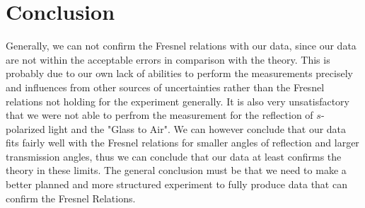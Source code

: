 \section{Conclusion}
Generally, we can not confirm the Fresnel relations with our data, since our data are not within the acceptable errors in comparison with the theory. This is probably due to our own lack of abilities to perform the measurements precisely and influences from other sources of uncertainties rather than the Fresnel relations not holding for the experiment generally. It is also very unsatisfactory that we were not able to perfrom the measurement for the reflection of $s$-polarized light and the "Glass to Air". We can however conclude that our data fits fairly well with the Fresnel relations for smaller angles of reflection and larger transmission angles, thus we can conclude that our data at least confirms the theory in these limits. The general conclusion must be that we need to make a better planned and more structured experiment to fully produce data that can confirm the Fresnel Relations. 
